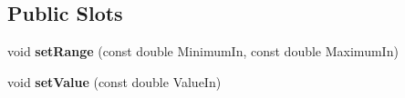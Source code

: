 \subsection*{Public Slots}
\begin{DoxyCompactItemize}
\item 
\hypertarget{classQEAnalogIndicator_a11b88174c6690b26c89e86c876237362}{
void {\bfseries setRange} (const double MinimumIn, const double MaximumIn)}
\label{classQEAnalogIndicator_a11b88174c6690b26c89e86c876237362}

\item 
\hypertarget{classQEAnalogIndicator_aee5248686a351a16d03ed40d067fe19d}{
void {\bfseries setValue} (const double ValueIn)}
\label{classQEAnalogIndicator_aee5248686a351a16d03ed40d067fe19d}

\end{DoxyCompactItemize}
